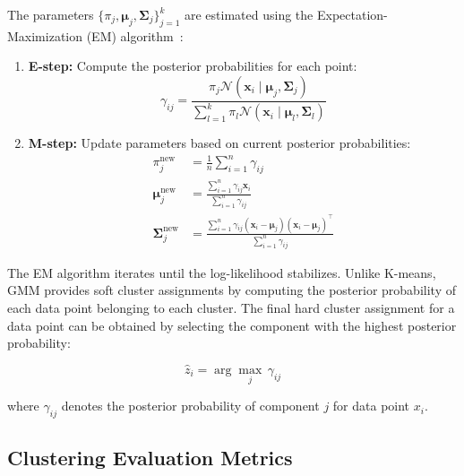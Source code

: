 The parameters $\{\pi_j, \boldsymbol{\mu}_j, \mathbf{\Sigma}_j\}_{j=1}^k$ are
estimated using the Expectation-Maximization (EM)
algorithm~\cite{em_algorithm}:

\begin{enumerate}
    \item \textbf{E-step:} Compute the posterior probabilities for each point:
          \begin{equation}
              \gamma_{ij} = \frac{\pi_j \mathcal{N}(\mathbf{x}_i \mid \boldsymbol{\mu}_j, \mathbf{\Sigma}_j)}
              {\sum_{l=1}^{k} \pi_l \mathcal{N}(\mathbf{x}_i \mid \boldsymbol{\mu}_l, \mathbf{\Sigma}_l)}
          \end{equation}

    \item \textbf{M-step:} Update parameters based on current posterior probabilities:
          \begin{align}
              \pi_j^{\text{new}}              & = \frac{1}{n} \sum_{i=1}^{n} \gamma_{ij}                                                                       \\
              \boldsymbol{\mu}_j^{\text{new}} & = \frac{\sum_{i=1}^{n} \gamma_{ij} \mathbf{x}_i}{\sum_{i=1}^{n} \gamma_{ij}}                                   \\
              \mathbf{\Sigma}_j^{\text{new}}  & = \frac{\sum_{i=1}^{n} \gamma_{ij}(\mathbf{x}_i - \boldsymbol{\mu}_j)(\mathbf{x}_i - \boldsymbol{\mu}_j)^\top}
              {\sum_{i=1}^{n} \gamma_{ij}}
          \end{align}
\end{enumerate}

The EM algorithm iterates until the log-likelihood stabilizes. Unlike K-means,
GMM provides soft cluster assignments by computing the posterior probability of
each data point belonging to each cluster. The final hard cluster assignment
for a data point can be obtained by selecting the component with the highest
posterior probability:

\begin{equation}
    \hat{z}_i = \arg\max_{j} \, \gamma_{ij}
\end{equation}

where $\gamma_{ij}$ denotes the posterior probability of component $j$ for data
point $x_i$.

\subsection{Clustering Evaluation Metrics}

